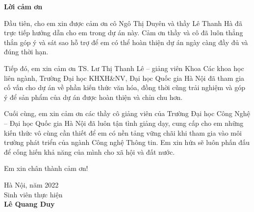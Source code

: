 \begin{center}
\textbf{\large{Lời cảm ơn}	}
\end{center}

Đầu tiên, cho em xin được cảm ơn cô Ngô Thị Duyên và thầy Lê Thanh Hà đã trực tiếp hướng dẫn cho em trong dự án này. Cảm ơn thầy và cô đã luôn thẳng thắn góp ý và sát sao hỗ trợ để em có thể hoàn thiện dự án ngày càng đầy đủ và đúng thời hạn.

Tiếp đó, em xin cảm ơn TS. Lư Thị Thanh Lê – giảng viên Khoa Các khoa học liên ngành, Trường Đại học KHXH\&NV, Đại học Quốc gia Hà Nội đã tham gia cố vấn cho dự án về phần kiến thức văn hóa, đồng thời cũng trải nghiệm và góp ý để sản phẩm của dự án được hoàn thiện và chỉn chu hơn.

Cuối cùng, em xin cảm ơn các thầy cô giảng viên của Trường Đại học Công Nghệ – Đại học Quốc gia Hà Nội đã luôn tận tình giảng dạy, cung cấp cho em những kiến thức vô cùng cần thiết để em có nền tảng vững chãi khi tham gia vào môi trường phát triển của ngành Công nghệ Thông tin. Em xin hứa sẽ luôn phấn đấu để cống hiến khả năng của mình cho xã hội và đất nước.

Em xin chân thành cảm ơn!

\vspace{1cm}
\begin{flushright}
    Hà Nội, năm 2022\\
    Sinh viên thực hiện\\[0.5cm]
    \textbf{Lê Quang Duy}
\end{flushright}
